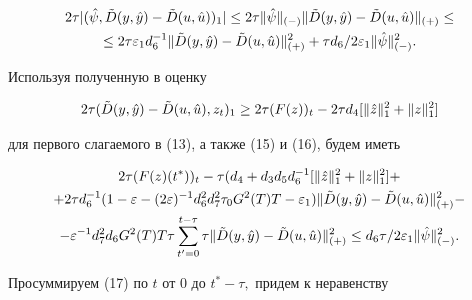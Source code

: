 \begin{multline} 


2\tau|(\Hat \psi, \Tilde D(y,\Hat y)-\Tilde D(u,\Hat u))_1| \le 


2\tau\|\Hat \psi\|_{(-)}\|\Tilde D(y,\Hat y)-\Tilde D(u,\Hat u)\|_{(+)} 


\le \\ 


\le 2\tau\varepsilon_1 d_6^{-1}\|\Tilde D(y,\Hat y)- 


\Tilde D(u,\Hat u)\|^2_{(+)}+\tau d_6/2\varepsilon_1\|\Hat \psi\|^2_{(-)}. 


\end{multline} 


Используя полученную в \cite{Fed2} оценку 


$$ 


2\tau(\Tilde D(y,\Hat y)-\Tilde D(u,\Hat u),z_t)_1 \ge 


2\tau(F(z))_t-2\tau d_4[\|\Hat z\|^2_1+\|z\|^2_1] 


$$ 


для первого слагаемого в (13), а также (15) и (16), будем иметь 


\begin{gather} 


2\tau(F(z)(t^*))_t -\tau(d_4+d_3d_5d_6^{-1} 


[\|\Hat z\|^2_1+\|z\|^2_1]+ \notag\\ 


+2\tau d_6^{-1}(1-\varepsilon-(2\varepsilon)^{-1}d_6^2d_7^2\tau_0G^2(T)T- 


\varepsilon_1)\|\Tilde D(y,\Hat y)-\Tilde D(u,\Hat u)\|^2_{(+)}-\notag \\ 


-\varepsilon^{-1}d_7^2 d_6 G^2(T)T \tau\sum^{t-\tau}_{t'=0}\tau 


\|\Tilde D(y,\Hat y)-\Tilde D(u,\Hat u)\|^2_{(+)} \le d_6 


\tau/2\varepsilon_1\|\Hat \psi\|^2_{(-)}. 


\end{gather} 


Просуммируем (17) по $t$ от 0 до $t^*-\tau,$ придем к неравенству 


